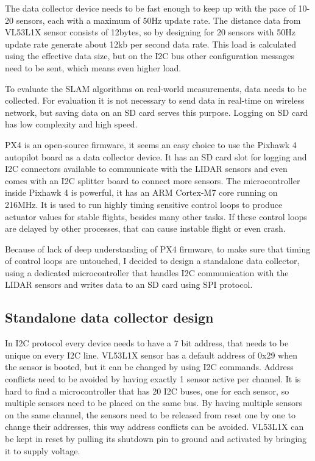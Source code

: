 The data collector device needs to be fast enough to keep up with the pace of 10-20 sensors,
each with a maximum of 50Hz update rate. The distance data from VL53L1X sensor consists of 12bytes, 
so by designing for 20 sensors with 50Hz update rate generate about 12kb per second data rate. This 
load is calculated using the effective data size, but on the I2C bus other configuration messages 
need to be sent, which means even higher load.

To evaluate the SLAM algorithms on real-world measurements, data needs to be collected. 
For evaluation it is not necessary to send data in real-time on wireless network, but saving 
data on an SD card serves this purpose. Logging on SD card has low complexity and high speed. 

PX4 is an open-source firmware, it seems an easy choice to use the Pixhawk 4 autopilot board 
as a data collector device. It has an SD card slot for logging and I2C connectors available to
communicate with the LIDAR sensors and even comes with an I2C splitter board to connect more sensors.
The microcontroller inside Pixhawk 4 is powerful, it has an ARM Cortex-M7 core running on 216MHz. 
It is used to run highly timing sensitive control loops to produce actuator values for stable flights,
besides many other tasks. If these control loops are delayed by other processes, that can 
cause instable flight or even crash.

Because of lack of deep understanding of PX4 firmware, to make sure that timing of control loops 
are untouched, I decided to design a standalone data collector, using a dedicated microcontroller that
handles I2C communication with the LIDAR sensors and writes data to an SD card using SPI protocol.

\subsection{Standalone data collector design}
In I2C protocol every device needs to have a 7 bit address, that needs to be unique on every
I2C line. VL53L1X sensor has a default address of 0x29 when the sensor is booted, but it can be changed
by using I2C commands. Address conflicts need to be avoided by having exactly 1 sensor active per channel.
It is hard to find a microcontroller that has 20 I2C buses, one for each sensor, so multiple sensors
need to be placed on the same bus. By having multiple sensors on the same channel, the sensors need to 
be released from reset one by one to change their addresses, this way address conflicts can be avoided.
VL53L1X can be kept in reset by pulling its shutdown pin to ground and activated by bringing it to 
supply voltage. 

